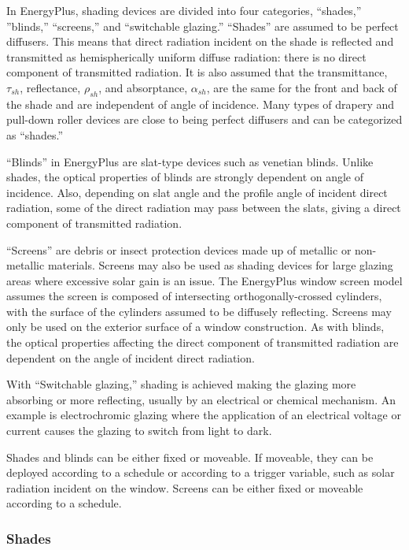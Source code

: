 In EnergyPlus, shading devices are divided into four categories, ``shades,'' ''blinds,'' ``screens,'' and ``switchable glazing.'' ``Shades'' are assumed to be perfect diffusers. This means that direct radiation incident on the shade is reflected and transmitted as hemispherically uniform diffuse radiation: there is no direct component of transmitted radiation. It is also assumed that the transmittance, \(\tau_{sh}\), reflectance, \(\rho_{sh}\), and absorptance, \(\alpha_{sh}\), are the same for the front and back of the shade and are independent of angle of incidence. Many types of drapery and pull-down roller devices are close to being perfect diffusers and can be categorized as ``shades.''

``Blinds'' in EnergyPlus are slat-type devices such as venetian blinds. Unlike shades, the optical properties of blinds are strongly dependent on angle of incidence. Also, depending on slat angle and the profile angle of incident direct radiation, some of the direct radiation may pass between the slats, giving a direct component of transmitted radiation.

``Screens'' are debris or insect protection devices made up of metallic or non-metallic materials. Screens may also be used as shading devices for large glazing areas where excessive solar gain is an issue. The EnergyPlus window screen model assumes the screen is composed of intersecting orthogonally-crossed cylinders, with the surface of the cylinders assumed to be diffusely reflecting. Screens may only be used on the exterior surface of a window construction. As with blinds, the optical properties affecting the direct component of transmitted radiation are dependent on the angle of incident direct radiation.

With ``Switchable glazing,'' shading is achieved making the glazing more absorbing or more reflecting, usually by an electrical or chemical mechanism. An example is electrochromic glazing where the application of an electrical voltage or current causes the glazing to switch from light to dark.

Shades and blinds can be either fixed or moveable. If moveable, they can be deployed according to a schedule or according to a trigger variable, such as solar radiation incident on the window. Screens can be either fixed or moveable according to a schedule.

\subsubsection{Shades}\label{shades}

